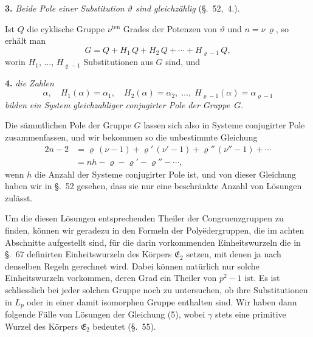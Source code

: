 \documentclass[12pt,a4paper]{article}
\begin{document}
\medskip\noindent
\textbf{3.} \emph{Beide Pole einer Substitution $\vartheta$ sind gleichzählig} (\S.~52,~4.).

Ist $Q$ die cyklische Gruppe $\nu^{\text{ten}}$ Grades der Potenzen von $\vartheta$ und $n = \nu\,\varrho$, so erhält man
\[
G = Q + H_{1}\,Q + H_{2}\,Q + \cdots + H_{\varrho-1}\,Q,
\]
worin $H_{1}$, $\ldots$, $H_{\varrho-1}$ Substitutionen aus $G$ sind, und

\medskip\noindent
\textbf{4.} \emph{die Zahlen}
\begin{equation}\label{eq:71.4}
\tag{4}
\alpha,\quad H_{1}(\alpha) = \alpha_{1},\quad
H_{2}(\alpha) = \alpha_{2},\; \ldots,\;
H_{\varrho-1}(\alpha) = \alpha_{\varrho-1}
\end{equation}
\emph{bilden ein System gleichzahliger conjugirter Pole der Gruppe}~$G$.

Die sämmtlichen Pole der Gruppe $G$ lassen sich also in Systeme conjugirter Pole zusammenfassen, und wir bekommen so die unbestimmte Gleichung
\begin{equation}\label{eq:71.5}
\tag{5}
\begin{aligned}
2n - 2 &= \varrho\,(\nu - 1) + \varrho'\,(\nu' - 1) + \varrho''\,(\nu'' - 1) + \cdots\\
&= nh - \varrho - \varrho' - \varrho'' - \cdots,
\end{aligned}
\end{equation}
wenn $h$ die Anzahl der Systeme conjugirter Pole ist, und von dieser Gleichung haben wir in \S.~52 gesehen, dass sie nur eine beschränkte Anzahl von Lösungen zulässt.

Um die diesen Lösungen entsprechenden Theiler der Congruenzgruppen zu finden, können wir geradezu in den Formeln der Polyëdergruppen, die im achten Abschnitte aufgestellt sind, für die darin vorkommenden Einheitswurzeln die in \S.~67 definirten Einheitswurzeln des Körpers $\mathfrak{E}_{2}$ setzen, mit denen ja nach denselben Regeln gerechnet wird. Dabei können natürlich nur solche Einheitswurzeln vorkommen, deren Grad ein Theiler von $p^{2} - 1$ ist. Es ist schliesslich bei jeder solchen Gruppe noch zu untersuchen, ob ihre Substitutionen in $L_{p}$ oder in einer damit isomorphen Gruppe enthalten sind. Wir haben dann folgende Fälle von Lösungen der Gleichung (5), wobei $\gamma$ stets eine primitive Wurzel des Körpers $\mathfrak{E}_{2}$ bedeutet (\S.~55).
\end{document}
